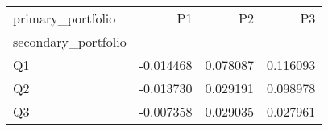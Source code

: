 \begin{tabular}{lrrr}
\toprule
primary_portfolio & P1 & P2 & P3 \\
secondary_portfolio &  &  &  \\
\midrule
Q1 & -0.014468 & 0.078087 & 0.116093 \\
Q2 & -0.013730 & 0.029191 & 0.098978 \\
Q3 & -0.007358 & 0.029035 & 0.027961 \\
\bottomrule
\end{tabular}
